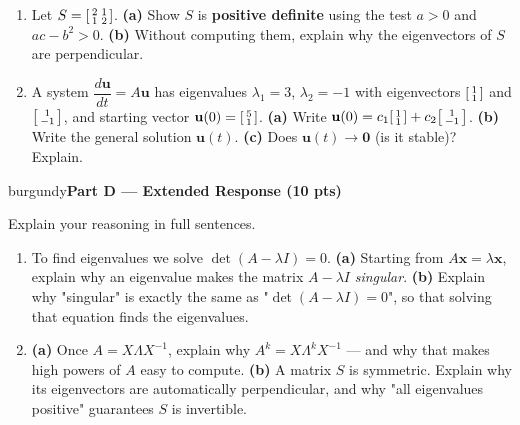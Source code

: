 \documentclass[10pt]{article}
\newcommand{\xx}{\mathbf{x}}
\newcommand{\uu}{\mathbf{u}}
\newcommand{\parthead}[1]{%
  \vspace{6pt}\noindent
  \begin{headlinebox}{burgundy}{\color{white}\bfseries #1}\end{headlinebox}%
  \vspace{4pt}}
\begin{document}
\begin{enumerate}[leftmargin=1.9em, itemsep=12pt]
        \textbf{(b)} $Q=\begin{bsmallmatrix}2&1\\1&2\end{bsmallmatrix}$.
        \vspace{2.6cm}
  \item Let $S=\begin{bsmallmatrix}2&1\\1&2\end{bsmallmatrix}$.
        \textbf{(a)} Show $S$ is \textbf{positive definite} using the test $a>0$ and $ac-b^2>0$.
        \textbf{(b)} Without computing them, explain why the eigenvectors of $S$ are perpendicular.
        \vspace{2.4cm}
  \item A system $\dfrac{d\uu}{dt}=A\uu$ has eigenvalues $\lambda_1=3$, $\lambda_2=-1$ with eigenvectors
        $\begin{bsmallmatrix}1\\1\end{bsmallmatrix}$ and $\begin{bsmallmatrix}1\\-1\end{bsmallmatrix}$, and starting
        vector $\uu(0)=\begin{bsmallmatrix}5\\1\end{bsmallmatrix}$.
        \textbf{(a)} Write $\uu(0)=c_1\begin{bsmallmatrix}1\\1\end{bsmallmatrix}+c_2\begin{bsmallmatrix}1\\-1\end{bsmallmatrix}$.
        \textbf{(b)} Write the general solution $\uu(t)$. \textbf{(c)} Does $\uu(t)\to\mathbf{0}$ (is it stable)? Explain.
        \vspace{3.0cm}
\end{enumerate}

\parthead{Part D --- Extended Response (10 pts)}
Explain your reasoning in full sentences.

\begin{enumerate}[leftmargin=1.9em, itemsep=16pt]
  \item To find eigenvalues we solve $\det(A-\lambda I)=0$.
        \textbf{(a)} Starting from $A\xx=\lambda\xx$, explain why an eigenvalue makes the matrix $A-\lambda I$
        \emph{singular}. \textbf{(b)} Explain why "singular" is exactly the same as "$\det(A-\lambda I)=0$", so
        that solving that equation finds the eigenvalues.
        \vspace{3.0cm}
  \item \textbf{(a)} Once $A=X\Lambda X^{-1}$, explain why $A^k=X\Lambda^k X^{-1}$ --- and why that makes high
        powers of $A$ easy to compute. \textbf{(b)} A matrix $S$ is symmetric. Explain why its eigenvectors are
        automatically perpendicular, and why "all eigenvalues positive" guarantees $S$ is invertible.
        \vspace{2.8cm}
\end{enumerate}
\end{document}

